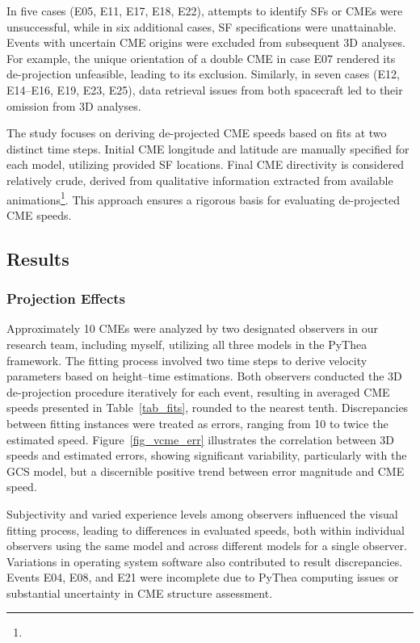 In five cases (E05, E11, E17, E18, E22), attempts to identify SFs or CMEs were unsuccessful, while in six additional cases, SF specifications were unattainable. Events with uncertain CME origins were excluded from subsequent 3D analyses. For example, the unique orientation of a double CME in case E07 rendered its de-projection unfeasible, leading to its exclusion. Similarly, in seven cases (E12, E14–E16, E19, E23, E25), data retrieval issues from both spacecraft led to their omission from 3D analyses.

The study focuses on deriving de-projected CME speeds based on fits at two distinct time steps. Initial CME longitude and latitude are manually specified for each model, utilizing provided SF locations. Final CME directivity is considered relatively crude, derived from qualitative information extracted from available animations\footnote{\helioweatherurl}. This approach ensures a rigorous basis for evaluating de-projected CME speeds.

\subsection{Results}
\subsubsection{Projection Effects}
Approximately 10 CMEs were analyzed by two designated observers in our research team, including myself, utilizing all three models in the PyThea framework. The fitting process involved two time steps to derive velocity parameters based on height–time estimations. Both observers conducted the 3D de-projection procedure iteratively for each event, resulting in averaged CME speeds presented in Table~\ref{tab_fits}, rounded to the nearest tenth. Discrepancies between fitting instances were treated as errors, ranging from 10 \kms to twice the estimated speed. Figure~\ref{fig_vcme_err} illustrates the correlation between 3D speeds and estimated errors, showing significant variability, particularly with the GCS model, but a discernible positive trend between error magnitude and CME speed.

Subjectivity and varied experience levels among observers influenced the visual fitting process, leading to differences in evaluated speeds, both within individual observers using the same model and across different models for a single observer. Variations in operating system software also contributed to result discrepancies. Events E04, E08, and E21 were incomplete due to PyThea computing issues or substantial uncertainty in CME structure assessment.

